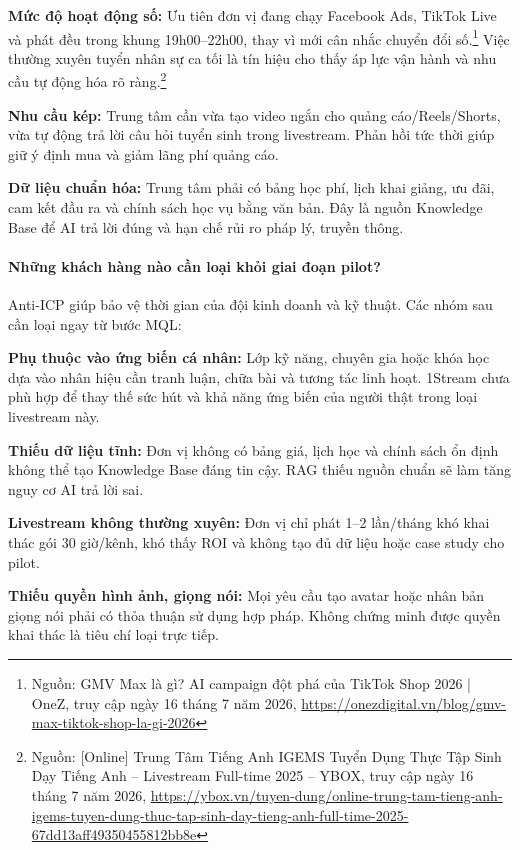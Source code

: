 \textbf{Mức độ hoạt động số:} Ưu tiên đơn vị đang chạy Facebook Ads, TikTok Live và phát đều trong khung 19h00--22h00, thay vì mới cân nhắc chuyển đổi số.\footnote{Nguồn: GMV Max là gì? AI campaign đột phá của TikTok Shop 2026 | OneZ, truy cập ngày 16 tháng 7 năm 2026, \url{https://onezdigital.vn/blog/gmv-max-tiktok-shop-la-gi-2026}} Việc thường xuyên tuyển nhân sự ca tối là tín hiệu cho thấy áp lực vận hành và nhu cầu tự động hóa rõ ràng.\footnote{Nguồn: [Online] Trung Tâm Tiếng Anh IGEMS Tuyển Dụng Thực Tập Sinh Dạy Tiếng Anh -- Livestream Full-time 2025 -- YBOX, truy cập ngày 16 tháng 7 năm 2026, \url{https://ybox.vn/tuyen-dung/online-trung-tam-tieng-anh-igems-tuyen-dung-thuc-tap-sinh-day-tieng-anh-full-time-2025-67dd13aff49350455812bb8e}}

\textbf{Nhu cầu kép:} Trung tâm cần vừa tạo video ngắn cho quảng cáo/Reels/Shorts, vừa tự động trả lời câu hỏi tuyển sinh trong livestream. Phản hồi tức thời giúp giữ ý định mua và giảm lãng phí quảng cáo.

\textbf{Dữ liệu chuẩn hóa:} Trung tâm phải có bảng học phí, lịch khai giảng, ưu đãi, cam kết đầu ra và chính sách học vụ bằng văn bản. Đây là nguồn Knowledge Base để AI trả lời đúng và hạn chế rủi ro pháp lý, truyền thông.

\paragraph{Những khách hàng nào cần loại khỏi giai đoạn pilot?}

Anti-ICP giúp bảo vệ thời gian của đội kinh doanh và kỹ thuật. Các nhóm sau cần loại ngay từ bước MQL:

\textbf{Phụ thuộc vào ứng biến cá nhân:} Lớp kỹ năng, chuyên gia hoặc khóa học dựa vào nhân hiệu cần tranh luận, chữa bài và tương tác linh hoạt. 1Stream chưa phù hợp để thay thế sức hút và khả năng ứng biến của người thật trong loại livestream này.

\textbf{Thiếu dữ liệu tĩnh:} Đơn vị không có bảng giá, lịch học và chính sách ổn định không thể tạo Knowledge Base đáng tin cậy. RAG thiếu nguồn chuẩn sẽ làm tăng nguy cơ AI trả lời sai.

\textbf{Livestream không thường xuyên:} Đơn vị chỉ phát 1--2 lần/tháng khó khai thác gói 30 giờ/kênh, khó thấy ROI và không tạo đủ dữ liệu hoặc case study cho pilot.

\textbf{Thiếu quyền hình ảnh, giọng nói:} Mọi yêu cầu tạo avatar hoặc nhân bản giọng nói phải có thỏa thuận sử dụng hợp pháp. Không chứng minh được quyền khai thác là tiêu chí loại trực tiếp.

